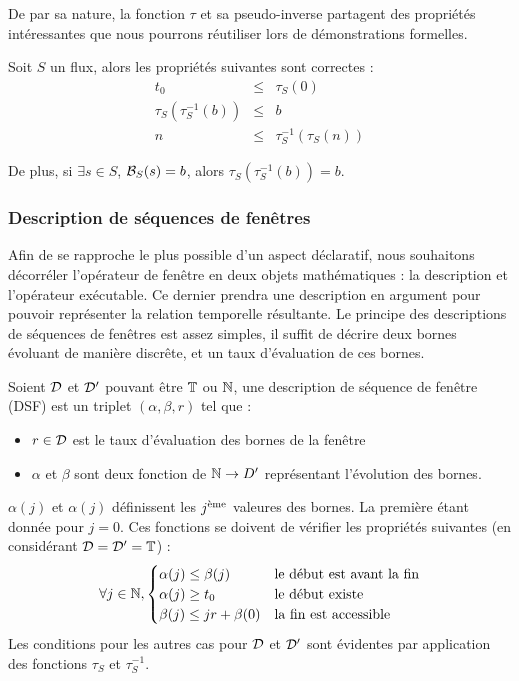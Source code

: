 De par sa nature, la fonction $\tau$ et sa pseudo-inverse partagent des propriétés intéressantes que nous pourrons réutiliser lors de démonstrations formelles.
\begin{prop}
    Soit $S$ un flux, alors les propriétés suivantes sont correctes :
    \begin{eqnarray*}
        t_0 & \leq & \tau_S(0) \\
        \tau_S(\tau_S^{-1}(b)) & \leq & b \\
        n & \leq & \tau_S^{-1}(\tau_S(n))
    \end{eqnarray*}

    De plus, si $\exists s \in S$, $\mathcal{B}_S(s)=b$, alors $\tau_S(\tau_S^{-1}(b)) = b$.
\end{prop}
\subsubsection{Description de séquences de fenêtres}
Afin de se rapproche le plus possible d'un aspect déclaratif, nous souhaitons décorréler l'opérateur de fenêtre en deux objets mathématiques : la description et l'opérateur exécutable. Ce dernier prendra une description en argument pour pouvoir représenter la relation temporelle résultante. Le principe des descriptions de séquences de fenêtres est assez simples, il suffit de décrire deux bornes évoluant de manière discrête, et un taux d'évaluation de ces bornes.

\begin{defi}
    Soient $\mathcal{D}$ et $\mathcal{D}'$ pouvant être $\mathbb{T}$ ou $\mathbb{N}$, une description de séquence de fenêtre (DSF) est un triplet $(\alpha,\beta,r)$ tel que :
\begin{itemize}
    \item $r \in \mathcal{D}$ est le taux d'évaluation des bornes de la fenêtre
    \item $\alpha$ et $\beta$ sont deux fonction de $\mathbb{N}\to D'$ représentant l'évolution des bornes.
\end{itemize}

$\alpha(j)$ et $\alpha(j)$ définissent les $j^{\textrm{\`{e}me}}$ valeures des bornes. La première étant donnée pour $j=0$. Ces fonctions se doivent de vérifier les propriétés suivantes (en considérant $\mathcal{D}=\mathcal{D}'=\mathbb{T}$) :
$$\forall j \in \mathbb{N}, \begin{cases} \alpha(j) \leq \beta(j) & \textrm{le début est avant la fin}\\ \alpha(j) \geq t_0 & \textrm{le début existe} \\ \beta(j) \leq jr + \beta(0) & \textrm{la fin est accessible} \end{cases}$$
    Les conditions pour les autres cas pour $\mathcal{D}$ et $\mathcal{D}'$ sont évidentes par application des fonctions $\tau_S$ et $\tau_S^{-1}$.
\end{defi}

